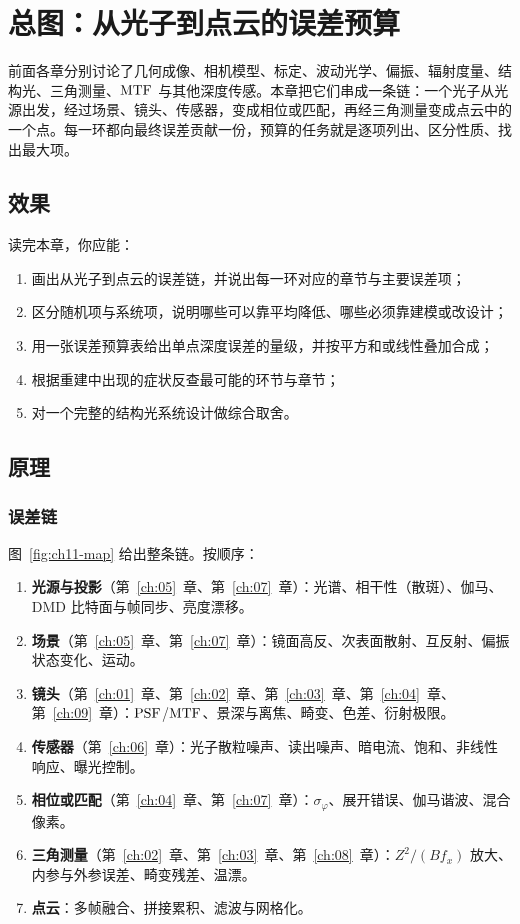 \chapter{总图：从光子到点云的误差预算}
\label{ch:11}

前面各章分别讨论了几何成像、相机模型、标定、波动光学、偏振、辐射度量、结构光、三角测量、$\mathrm{MTF}$ 与其他深度传感。本章把它们串成一条链：一个光子从光源出发，经过场景、镜头、传感器，变成相位或匹配，再经三角测量变成点云中的一个点。每一环都向最终误差贡献一份，预算的任务就是逐项列出、区分性质、找出最大项。

\section{效果}
\label{sec:ch11-effect}

读完本章，你应能：
\begin{enumerate}
  \item 画出从光子到点云的误差链，并说出每一环对应的章节与主要误差项；
  \item 区分随机项与系统项，说明哪些可以靠平均降低、哪些必须靠建模或改设计；
  \item 用一张误差预算表给出单点深度误差的量级，并按平方和或线性叠加合成；
  \item 根据重建中出现的症状反查最可能的环节与章节；
  \item 对一个完整的结构光系统设计做综合取舍。
\end{enumerate}

\section{原理}
\label{sec:ch11-principle}

\subsection{误差链}

图~\ref{fig:ch11-map} 给出整条链。按顺序：
\begin{enumerate}
  \item \textbf{光源与投影}（第~\ref{ch:05}~章、第~\ref{ch:07}~章）：光谱、相干性（散斑）、伽马、DMD 比特面与帧同步、亮度漂移。
  \item \textbf{场景}（第~\ref{ch:05}~章、第~\ref{ch:07}~章）：镜面高反、次表面散射、互反射、偏振状态变化、运动。
  \item \textbf{镜头}（第~\ref{ch:01}~章、第~\ref{ch:02}~章、第~\ref{ch:03}~章、第~\ref{ch:04}~章、第~\ref{ch:09}~章）：$\mathrm{PSF}$/$\mathrm{MTF}$、景深与离焦、畸变、色差、衍射极限。
  \item \textbf{传感器}（第~\ref{ch:06}~章）：光子散粒噪声、读出噪声、暗电流、饱和、非线性响应、曝光控制。
  \item \textbf{相位或匹配}（第~\ref{ch:04}~章、第~\ref{ch:07}~章）：$\sigma_\varphi$、展开错误、伽马谐波、混合像素。
  \item \textbf{三角测量}（第~\ref{ch:02}~章、第~\ref{ch:03}~章、第~\ref{ch:08}~章）：$Z^2/(Bf_x)$ 放大、内参与外参误差、畸变残差、温漂。
  \item \textbf{点云}：多帧融合、拼接累积、滤波与网格化。
\end{enumerate}

